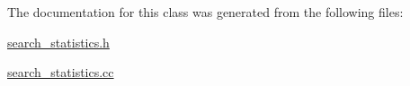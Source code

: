 The documentation for this class was generated from the following files\-:\begin{DoxyCompactItemize}
\item 
\hyperlink{search__statistics_8h}{search\-\_\-statistics.\-h}\item 
\hyperlink{search__statistics_8cc}{search\-\_\-statistics.\-cc}\end{DoxyCompactItemize}
